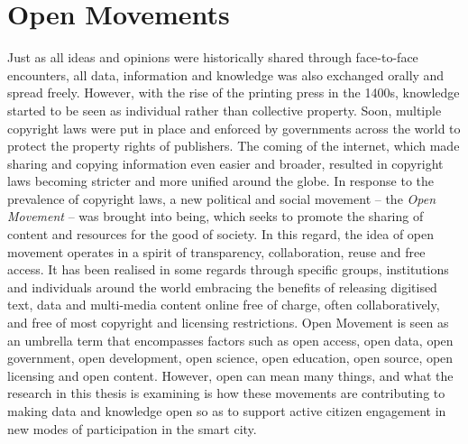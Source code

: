 \section{Open Movements}
\label{sec:open-movements}
Just as all ideas and opinions were historically shared through face-to-face encounters, all data, information and knowledge was also exchanged orally and spread freely. However, with the rise of the printing press in the 1400s, knowledge started to be seen as individual rather than collective property. Soon, multiple copyright laws were put in place and enforced by governments across the world to protect the property rights of publishers. The coming of the internet, which made sharing and copying information even easier and broader, resulted in copyright laws becoming stricter and more unified around the globe. In response to the prevalence of copyright laws, a new political and social movement -- the \textit{Open Movement} -- was brought into being, which seeks to promote the sharing of content and resources for the good of society. In this regard, the idea of open movement operates in a spirit of transparency, collaboration, reuse and free access. It has been realised in some regards through specific groups, institutions and individuals around the world embracing the benefits of releasing digitised text, data and multi-media content online free of charge, often collaboratively, and free of most copyright and licensing restrictions. Open Movement is seen as an umbrella term that encompasses factors such as open access, open data, open government, open development, open science, open education, open source, open licensing and open content. However, open can mean many things, and what the research in this thesis is examining is how these movements are contributing to making data and knowledge open so as to support active citizen engagement in new modes of participation in the smart city.

